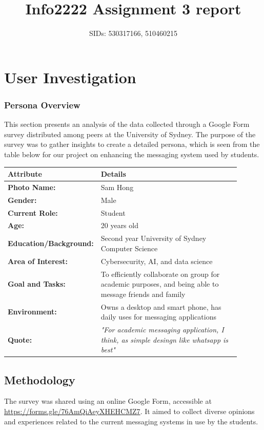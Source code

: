 \documentclass[12pt,a4paper]{article}
\title{Info2222 Assignment 3 report}
\author{SIDs: 530317166, 510460215}
\date{}
\begin{document}
\maketitle

\section{User Investigation}
\subsubsection*{Persona Overview}
This section presents an analysis of the data collected through a Google Form survey distributed among peers at the University of Sydney. The purpose of the survey was to gather insights to create a detailed persona, which is seen from the table below for our project on enhancing the messaging system used by students.

\noindent
\begin{tabular}{|p{0.3\linewidth}|p{0.6\linewidth}|}
\hline
\textbf{Attribute} & \textbf{Details} \\
\hline
\textbf{Photo Name:} & Sam Hong \\
\hline
\textbf{Gender:} & Male \\
\hline
\textbf{Current Role:} & Student \\
\hline
\textbf{Age:} & 20 years old \\
\hline
\textbf{Education/Background:} & Second year University of Sydney Computer Science \\
\hline
\textbf{Area of Interest:} & Cybersecurity, AI, and data science \\
\hline
\textbf{Goal and Tasks:} & To efficiently collaborate on group for academic purposes, and being able to message friends and family \\
\hline
\textbf{Environment:} & Owns a desktop and smart phone, has daily uses for messaging applications \\
\hline
\textbf{Quote:} & \textit{"For academic messaging application, I think, as simple desingn like whatsapp is best"} \\
\hline
\end{tabular}


\subsection*{Methodology}
The survey was shared using an online Google Form, accessible at \url{https://forms.gle/76AmQiAeyXHEHCMZ7}. It aimed to collect diverse opinions and experiences related to the current messaging systems in use by the students.
\end{document}
